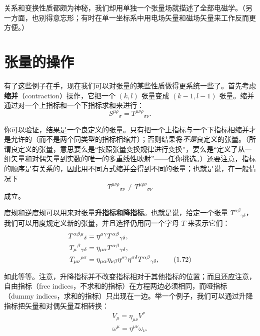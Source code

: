 关系和变换性质都颇为神秘，我们却用单独一个张量场就描述了全部电磁学。（另一方面，也别得意忘形；有时在单一坐标系中用电场矢量和磁场矢量来工作反而更方便。）

\section{张量的操作}

有了这些例子在手，现在我们可以对张量的某些性质做得更系统一些了。首先考虑\textbf{缩并}（contraction）操作，它把一个 $(k,l)$ 张量变成 $(k-1,l-1)$ 张量。缩并通过对一个上指标和一个下指标求和来进行：
\begin{equation*}
S^{\mu\rho}{}_{\sigma} = T^{\mu\nu\rho}{}_{\sigma\nu}.
\tag{1.70}
\end{equation*}

你可以验证，结果是一个良定义的张量。只有把一个上指标与一个下指标相缩并才是允许的（而不是两个同类型的指标相缩并）；否则结果将\emph{不是}良定义的张量。（所谓良定义的张量，意思要么是“按照张量变换规律进行变换”，要么是“定义了从一组矢量和对偶矢量到实数的唯一的多重线性映射”——任你挑选。）还要注意，指标的顺序是有关系的，因此用不同方式缩并会得到不同的张量；也就是说，在一般情况下
\begin{equation*}
T^{\mu\nu\rho}{}_{\sigma\nu} \neq T^{\mu\rho\nu}{}_{\sigma\nu}
\tag{1.71}
\end{equation*}
成立。

度规和逆度规可以用来对张量\textbf{升指标和降指标}。也就是说，给定一个张量 $T^{\alpha\beta}{}_{\gamma\delta}$，我们可以用度规定义新的张量，并且选择仍用同一个字母 $T$ 来表示它们：
\begin{align*}
T^{\alpha\beta\mu}{}_{\delta} &= \eta^{\mu\gamma}T^{\alpha\beta}{}_{\gamma\delta},\notag\\
T_{\mu}{}^{\beta}{}_{\gamma\delta} &= \eta_{\mu\alpha}T^{\alpha\beta}{}_{\gamma\delta},\notag\\
T_{\mu\nu}{}^{\rho\sigma} &= \eta_{\mu\alpha}\eta_{\nu\beta}\eta^{\rho\gamma}\eta^{\sigma\delta}T^{\alpha\beta}{}_{\gamma\delta},
\tag{1.72}
\end{align*}

如此等等。注意，升降指标并不改变指标相对于其他指标的位置；而且还应注意，自由指标（free indices，不求和的指标）在方程两边必须相同，而哑指标（dummy indices，求和的指标）只出现在一边。举一个例子，我们可以通过升降指标把矢量和对偶矢量互相转换：
\begin{equation*}
\begin{gathered}
V_{\mu} = \eta_{\mu\nu}V^{\nu}\\
\omega^{\mu} = \eta^{\mu\nu}\omega_{\nu}.
\end{gathered}
\tag{1.73}
\end{equation*}

